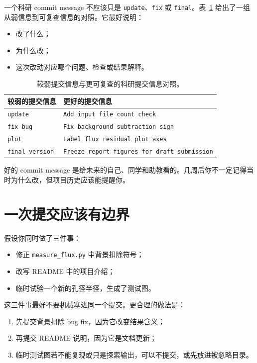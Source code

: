 一个科研 commit message 不应该只是 \texttt{update}、\texttt{fix} 或 \texttt{final}。表~\ref{tab:ch02_commit_messages} 给出了一组从弱信息到可复查信息的对照。它最好说明：

\begin{itemize}
    \item 改了什么；
    \item 为什么改；
    \item 这次改动对应哪个问题、检查或结果解释。
\end{itemize}

\begin{table}[htbp]
\centering
\begin{tabular}{p{}p{}}
\toprule
较弱的提交信息 & 更好的提交信息 \\
\midrule
\texttt{update} & \texttt{Add input file count check} \\
\texttt{fix bug} & \texttt{Fix background subtraction sign} \\
\texttt{plot} & \texttt{Label flux residual plot axes} \\
\texttt{final version} & \texttt{Freeze report figures for draft submission} \\
\bottomrule
\end{tabular}
\caption{较弱提交信息与更可复查的科研提交信息对照。}
\label{tab:ch02_commit_messages}
\end{table}

好的 commit message 是给未来的自己、同学和助教看的。几周后你不一定记得当时为什么改，但项目历史应该能提醒你。

\section{一次提交应该有边界}

假设你同时做了三件事：

\begin{itemize}
    \item 修正 \texttt{measure\_flux.py} 中背景扣除符号；
    \item 改写 README 中的项目介绍；
    \item 临时试验一个新的孔径半径，生成了测试图。
\end{itemize}

这三件事最好不要机械塞进同一个提交。更合理的做法是：

\begin{enumerate}
    \item 先提交背景扣除 bug fix，因为它改变结果含义；
    \item 再提交 README 说明，因为它是文档更新；
    \item 临时测试图若不能复现或只是探索输出，可以不提交，或先放进被忽略目录。
\end{enumerate}

